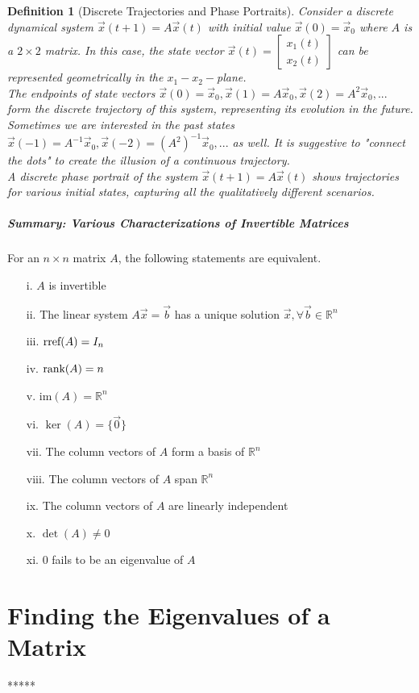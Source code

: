 \documentclass[10pt]{report}
\newtheorem{def2}{Definition}[section]
\newcommand{\rref}{\textup{rref}}
\newcommand{\rank}{\textup{rank}}
\begin{document}
\begin{def2}[Discrete Trajectories and Phase Portraits]
Consider a discrete dynamical system $\vec{x}(t+1)=A\vec{x}(t)$ with initial value $\vec{x}(0)=\vec{x}_0$ where $A$ is a $2\times 2$ matrix. In this case, the state vector $\vec{x}(t) = \left[\begin{array}{c}
x_1(t)\\
x_2(t)
\end{array}\right]$ can be represented geometrically in the $x_1-x_2-$plane.\\
The endpoints of state vectors $\vec{x}(0) = \vec{x}_0, \vec{x}(1)=A\vec{x}_0, \vec{x}(2) = A^2\vec{x}_0,...$ form the discrete trajectory of this system, representing its evolution in the future. Sometimes we are interested in the past states $\vec{x}(-1)=A^{-1}\vec{x}_0, \vec{x}(-2)=(A^2)^{-1}\vec{x}_0,...$ as well. It is suggestive to "connect the dots" to create the illusion of a continuous trajectory.\\
A discrete phase portrait of the system $\vec{x}(t+1)=A\vec{x}(t)$ shows trajectories for various initial states, capturing all the qualitatively different scenarios.
\end{def2}
\subparagraph{Summary: Various Characterizations of Invertible Matrices}
For an $n\times n$ matrix $A$, the following statements are equivalent.
\begin{itemize}
\item[i.] $A$ is invertible
\item[ii.] The linear system $A\vec{x}=\vec{b}$ has a unique solution $\vec{x}, \forall \vec{b}\in \mathbb{R}^n$
\item[iii.] $\rref(A)=I_n$
\item[iv.] $\rank(A)=n$
\item[v.] im$(A)=\mathbb{R}^n$
\item[vi.] $\ker(A)=\{\vec{0}\}$
\item[vii.] The column vectors of $A$ form a basis of $\mathbb{R}^n$
\item[viii.] The column vectors of $A$ span $\mathbb{R}^n$
\item[ix.] The column vectors of $A$ are linearly independent
\item[x.] $\det(A)\neq 0$
\item[xi.] $0$ fails to be an eigenvalue of $A$
\end{itemize}

\section{Finding the Eigenvalues of a Matrix}
*****
\end{document}
